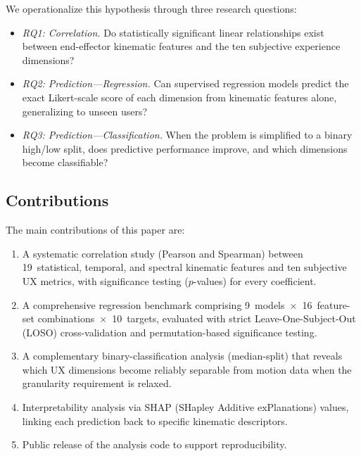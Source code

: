 We operationalize this hypothesis through three research questions:

\begin{itemize}

\item \emph{RQ1: Correlation.} Do statistically significant linear relationships exist between end-effector kinematic features and the ten subjective experience dimensions?

\item \emph{RQ2: Prediction---Regression.} Can supervised regression models predict the exact Likert-scale score of each dimension from kinematic features alone, generalizing to unseen users?

\item \emph{RQ3: Prediction---Classification.} When the problem is simplified to a binary high/low split, does predictive performance improve, and which dimensions become classifiable?

\end{itemize}

\subsection{Contributions}

The main contributions of this paper are:

\begin{enumerate}

\item A systematic correlation study (Pearson and Spearman) between 19~statistical, temporal, and spectral kinematic features and ten subjective UX metrics, with significance testing ($p$-values) for every coefficient.

\item A comprehensive regression benchmark comprising 9~models~$\times$~16~feature-set combinations~$\times$~10~targets, evaluated with strict Leave-One-Subject-Out (LOSO) cross-validation and permutation-based significance testing.

\item A complementary binary-classification analysis (median-split) that reveals which UX dimensions become reliably separable from motion data when the granularity requirement is relaxed.

\item Interpretability analysis via SHAP (SHapley Additive exPlanations) values, linking each prediction back to specific kinematic descriptors.

\item Public release of the analysis code to support reproducibility.

\end{enumerate}

